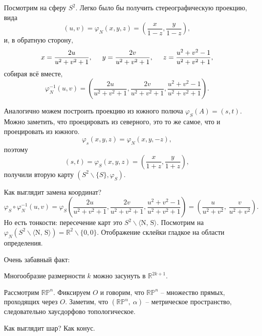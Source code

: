 \begin{to_exm} 
    Посмотрим на сферу $S^2$. Легко было бы получить стереографическую проекцию, вида
    \begin{equation}
        (u, v) = \varphi_N (x, y, z) = 
        \left(\frac{x}{1-z} , \frac{y}{1-z} \right),
    \end{equation}
    и, в обратную сторону,
    \begin{equation}
        x = \frac{2u}{u^2+v^2+1}, \hspace{0.5cm} 
        y = \frac{2v}{u^2+v^2+1} , \hspace{0.5cm} 
        z = \frac{u^2+v^2-1}{u^2+v^2+1},
    \end{equation}
    собирая всё вместе,
    \begin{equation*}
        \varphi_N^{-1}(u, v) = 
        \left(
            \frac{2u}{u^2+v^2+1},
            \frac{2v}{u^2+v^2+1},
            \frac{u^2+v^2-1}{u^2+v^2+1}
        \right).        
    \end{equation*}

    Аналогично можем построить проекцию из южного полюча $\varphi_S (A) = (s, t)$. Можно заметить, что проецировать из северного, это то же самое, что и проецировать из южного.
    \begin{equation*}
        \varphi_s (x, y,z) = \varphi_N (x, y, -z),
    \end{equation*}
    поэтому
    \begin{equation*}
        (s, t) = \varphi_S (x, y, z) = 
        \left(\frac{x}{1+z} , \frac{y}{1+z} \right),
    \end{equation*}
    получили вторую карту $\left( S^2 \backslash \{S\}, \varphi_S\right)$.

    Как выглядит замена координат?
\begin{equation*}
    \varphi_S \circ \varphi_N^{-1} (u, v) = 
    \varphi_S \left(
            \frac{2u}{u^2+v^2+1},
            \frac{2v}{u^2+v^2+1},
            \frac{u^2+v^2-1}{u^2+v^2+1}
        \right) = 
         \left(
            \frac{u}{u^2+v^2} , \ \frac{v}{u^2+v^2} 
         \right).
\end{equation*}
    Но есть тонкости: пересечение карт это $S^2 \backslash \langle \text{N, \ S}\rangle$. 
    Посмотрим на $\varphi_N (S^2 \backslash \langle \text{N, \ S}\rangle) = \mathbb{R}^2 \backslash \{0, 0\}$. Отображение склейки гладкое на области определения.  
\end{to_exm}


\noindent
Очень забавный факт:
\begin{to_thr}
     Многообразие размерности $k$ можно засунуть в $\mathbb{R}^{2k+1}$. 
\end{to_thr}


\begin{to_exm} 
    Рассмотрим $\mathbb{RP}^n$. Фиксируем $O$ и говорим, что $\mathbb{RP}^n$ -- множество прямых, проходящих через $O$. Заметим, что $\left(\mathbb{RP}^n, \ \alpha\right)$ -- метрическое пространство, следовательно хаусдорфово топологическое. 

    Как выглядит шар? Как конус. 
\end{to_exm}